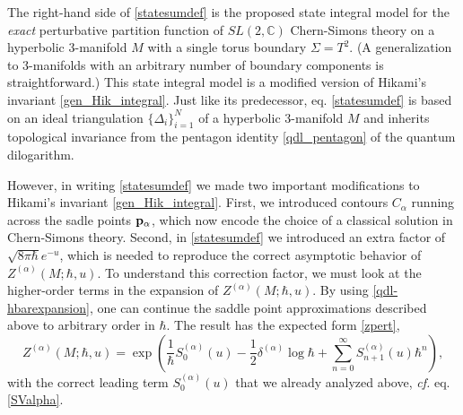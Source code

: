\documentclass[hyper]{JHEP3}
\newcommand{\C}{{\mathbb{C}}}
\newcommand\be{\begin{equation}}
\newcommand\ee{\end{equation}}
\begin{document}
The right-hand side of \eqref{statesumdef} is the proposed state integral model
for the {\it exact} perturbative partition function of $SL(2,\C)$ Chern-Simons
theory on a hyperbolic 3-manifold $M$ with a single torus boundary $\Sigma = T^2$.
(A generalization to 3-manifolds with an arbitrary number of boundary components
is straightforward.)
This state integral model is a modified version of Hikami's invariant \eqref{gen_Hik_integral}.
Just like its predecessor, eq. \eqref{statesumdef} is based
on an ideal triangulation $\{\Delta_i\}_{i=1}^N$
of a hyperbolic 3-manifold $M$ and inherits topological invariance from
the pentagon identity \eqref{qdl_pentagon} of the quantum dilogarithm.

However, in writing \eqref{statesumdef} we made two important
modifications to Hikami's invariant \eqref{gen_Hik_integral}.
First, we introduced contours $C_{\alpha}$ running across the sadle points ${\bf p}_\alpha$, which now encode the choice
of a classical solution in Chern-Simons theory.
Second,  in \eqref{statesumdef}
we introduced an extra factor of $\sqrt{8 \pi \hbar} e^{-u}$, which is needed
to reproduce the correct asymptotic behavior of $Z^{(\alpha)} (M; \hbar, u)$.
To understand this correction factor, we must look at the higher-order terms in the expansion of $Z^{(\alpha)}(M;\hbar,u)$.
By using \eqref{qdl-hbarexpansion}, one can continue the saddle point
approximations described above to arbitrary order in $\hbar$.
The result has the expected form \eqref{zpert},
\be
Z^{(\alpha)} (M;\hbar,u) =
\exp\left( \frac{1}{\hbar} S_0^{(\alpha)} (u) - \frac{1}{2}\delta^{(\alpha)} \log \hbar
+ \sum_{n=0}^\infty S_{n+1}^{(\alpha)} (u) \hbar^n  \right),
\label{zssspert}
\ee
with the correct leading term $S_0^{(\alpha)} (u)$
that we already analyzed above, {\it cf.} eq. \eqref{SValpha}.
\end{document}
